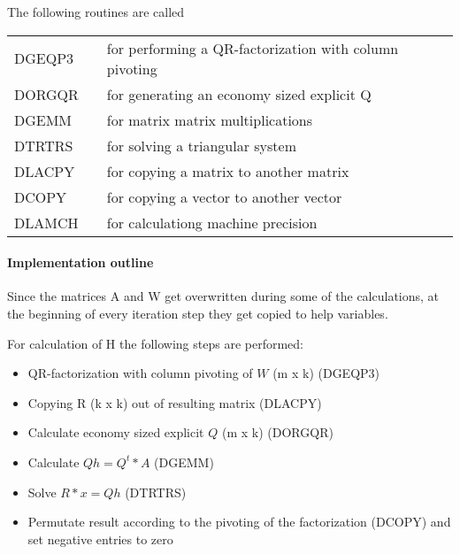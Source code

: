 \documentclass[a4paper,10pt]{scrartcl}
\begin{document}
					The following routines are called\newline

					\begin{tabular}{lcl}
						DGEQP3 && for performing a QR-factorization with column pivoting\\
						DORGQR && for generating an economy sized explicit Q\\
						DGEMM  && for matrix matrix multiplications\\
						DTRTRS && for solving a triangular system\\
						DLACPY && for copying a matrix to another matrix\\
						DCOPY  && for copying a vector to another vector\\
						DLAMCH && for calculationg machine precision
					\end{tabular}

			\paragraph{Implementation outline}


					Since the matrices A and W get overwritten during some of the calculations,
					at the beginning of every iteration step they get copied to help variables.
					\newline

					For calculation of H the following steps are performed:\newline

					\begin{itemize}
					 \item QR-factorization with column pivoting of $W$ (m x k) (DGEQP3)\newline
					 \item Copying R (k x k) out of resulting matrix (DLACPY)\newline
					 \item Calculate economy sized explicit $Q$ (m x k) (DORGQR)\newline
					 \item Calculate $Qh = Q^t * A$ (DGEMM)\newline
					 \item Solve $R * x = Qh$ (DTRTRS)\newline
					 \item Permutate result according to the pivoting of the factorization 
						(DCOPY) and set negative entries to zero\newline
					\end{itemize}
\end{document}
